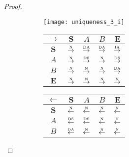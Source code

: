 \begin{proof}
\begin{figure}[htbp]
  \begin{subfigure}{1\textwidth}
    \vspace{1em}
    \centering
    \begin{minipage}[b]{1\textwidth}
      \centering
      \texttt{[image: uniqueness\_3\_i]}
    \end{minipage}
    \begin{minipage}[b]{0.3\textwidth}
      \vspace{1em}
      \centering
      \begin{tabular}{|c|c|c|c|c|} \hline
        $\rightarrow$ & $\bm{S}$ & $A$ & $B$ & $\bm{E}$\\ \hline
        $\bm{S}$ & $\overset{\text{\tiny{N}}}{\rightarrow}$ & $\overset{\text{\tiny{DA}}}{\rightarrow}$ & $\overset{\text{\tiny{DA}}}{\rightarrow}$ & $\overset{\text{\tiny{IA}}}{\rightarrow}$\\ \hline
        $A$ & $\overset{\text{\tiny{N}}}{\rightarrow}$ & $\overset{\text{\tiny{DS}}}{\rightarrow}$ & $\overset{\text{\tiny{N}}}{\rightarrow}$ & $\overset{\text{\tiny{DS}}}{\rightarrow}$\\ \hline
        $B$ & $\overset{\text{\tiny{N}}}{\rightarrow}$ & $\overset{\text{\tiny{N}}}{\rightarrow}$ & $\overset{\text{\tiny{N}}}{\rightarrow}$ & $\overset{\text{\tiny{DA}}}{\rightarrow}$\\ \hline
        $\bm{E}$ & $\overset{\text{\tiny{N}}}{\rightarrow}$ & $\overset{\text{\tiny{N}}}{\rightarrow}$ & $\overset{\text{\tiny{N}}}{\rightarrow}$ & $\overset{\text{\tiny{N}}}{\rightarrow}$\\ \hline
      \end{tabular}
    \end{minipage}
    \begin{minipage}[b]{0.3\textwidth}
      \vspace{1em}
      \centering
      \begin{tabular}{|c|c|c|c|c|} \hline
        $\leftarrow$ & $\bm{S}$ & $A$ & $B$ & $\bm{E}$\\ \hline
        $\bm{S}$ & $\overset{\text{\tiny{N}}}{\leftarrow}$ & $\overset{\text{\tiny{N}}}{\leftarrow}$ & $\overset{\text{\tiny{N}}}{\leftarrow}$ & $\overset{\text{\tiny{N}}}{\leftarrow}$\\ \hline
        $A$ & $\overset{\text{\tiny{DS}}}{\leftarrow}$ & $\overset{\text{\tiny{DS}}}{\leftarrow}$ & $\overset{\text{\tiny{N}}}{\leftarrow}$ & $\overset{\text{\tiny{N}}}{\leftarrow}$\\ \hline
        $B$ & $\overset{\text{\tiny{DA}}}{\leftarrow}$ & $\overset{\text{\tiny{N}}}{\leftarrow}$ & $\overset{\text{\tiny{N}}}{\leftarrow}$ & $\overset{\text{\tiny{N}}}{\leftarrow}$\\ \hline

\end{tabular}
\end{minipage}
\end{subfigure}
\end{figure}
\end{proof}
